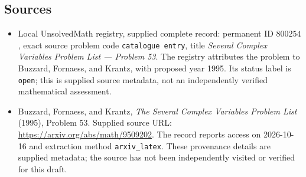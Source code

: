 \documentclass[11pt]{article}
\begin{document}
\subsection{Sources}
\begin{itemize}
\item Local UnsolvedMath registry, supplied complete record: permanent ID \(800254\), exact source problem code \texttt{catalogue entry}, title \emph{Several Complex Variables Problem List --- Problem 53}. The registry attributes the problem to Buzzard, Fornaess, and Krantz, with proposed year 1995. Its status label is \texttt{open}; this is supplied source metadata, not an independently verified mathematical assessment.
\item Buzzard, Fornaess, and Krantz, \emph{The Several Complex Variables Problem List} (1995), Problem 53. Supplied source URL: \url{https://arxiv.org/abs/math/9509202}. The record reports access on 2026-10-16 and extraction method \texttt{arxiv\_latex}. These provenance details are supplied metadata; the source has not been independently visited or verified for this draft.
\end{itemize}
\end{document}
